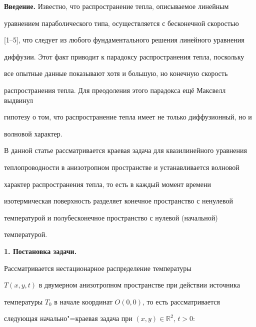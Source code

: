 \date{11/X/2009}




\maketitle 



\small



\textbf{Введение.} Известно, что распространение тепла, описываемое линейным 

уравнением параболического типа, осуществляется с бесконечной скоростью 

[1--5], что следует из любого фундаментального решения линейного уравнения 

диффузии. Этот факт приводит к парадоксу распространения тепла, поскольку 

все опытные данные показывают хотя и большую, но конечную скорость 

распространения тепла. Для преодоления этого парадокса ещё Максвелл выдвинул 

гипотезу о том, что распространение тепла имеет не только диффузионный, но и 

волновой характер. 



В данной статье рассматривается краевая задача для квазилинейного уравнения 

теплопроводности в анизотропном пространстве и устанавливается волновой 

характер распространения тепла, то есть в каждый момент времени 

изотермическая поверхность разделяет конечное пространство с ненулевой 

температурой и полубесконечное пространство с нулевой (начальной) 

температурой.



\smallskip

\textbf{1. Постановка задачи.} 

Рассматривается нестационарное распределение температуры 

$T(x, y, t)$ в двумерном анизотропном пространстве при действии источника 

температуры $T_0 $ в начале координат $O(0, 0)$, то есть рассматривается 

следующая начально"=краевая задача при $(x ,y) \in \mathbb  R^2$, $t>0$:

